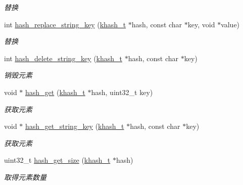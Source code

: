 \begin{DoxyCompactItemize}
\begin{DoxyCompactList}\small\item\em 替换 \end{DoxyCompactList}\item 
int \hyperlink{a00067_a042aba69d8451fd5322e3fe28aa65306_a042aba69d8451fd5322e3fe28aa65306}{hash\+\_\+replace\+\_\+string\+\_\+key} (\hyperlink{a00056_aa242a9a673d8677076543d5768798f2c_aa242a9a673d8677076543d5768798f2c}{khash\+\_\+t} $\ast$hash, const char $\ast$key, void $\ast$value)
\begin{DoxyCompactList}\small\item\em 替换 \end{DoxyCompactList}\item 
int \hyperlink{a00067_a74d116a714c4a2078f3163d7943ad41e_a74d116a714c4a2078f3163d7943ad41e}{hash\+\_\+delete\+\_\+string\+\_\+key} (\hyperlink{a00056_aa242a9a673d8677076543d5768798f2c_aa242a9a673d8677076543d5768798f2c}{khash\+\_\+t} $\ast$hash, const char $\ast$key)
\begin{DoxyCompactList}\small\item\em 销毁元素 \end{DoxyCompactList}\item 
void $\ast$ \hyperlink{a00067_a0cb115747d9533d24341fd2620c3ffb9_a0cb115747d9533d24341fd2620c3ffb9}{hash\+\_\+get} (\hyperlink{a00056_aa242a9a673d8677076543d5768798f2c_aa242a9a673d8677076543d5768798f2c}{khash\+\_\+t} $\ast$hash, uint32\+\_\+t key)
\begin{DoxyCompactList}\small\item\em 获取元素 \end{DoxyCompactList}\item 
void $\ast$ \hyperlink{a00067_afdbec876fbce40dd8750d26bb7f59e5b_afdbec876fbce40dd8750d26bb7f59e5b}{hash\+\_\+get\+\_\+string\+\_\+key} (\hyperlink{a00056_aa242a9a673d8677076543d5768798f2c_aa242a9a673d8677076543d5768798f2c}{khash\+\_\+t} $\ast$hash, const char $\ast$key)
\begin{DoxyCompactList}\small\item\em 获取元素 \end{DoxyCompactList}\item 
uint32\+\_\+t \hyperlink{a00067_a5cd157b8d91524da9b9f4a07f9d07f39_a5cd157b8d91524da9b9f4a07f9d07f39}{hash\+\_\+get\+\_\+size} (\hyperlink{a00056_aa242a9a673d8677076543d5768798f2c_aa242a9a673d8677076543d5768798f2c}{khash\+\_\+t} $\ast$hash)
\begin{DoxyCompactList}\small\item\em 取得元素数量 \end{DoxyCompactList}\item 

\end{DoxyCompactItemize}

